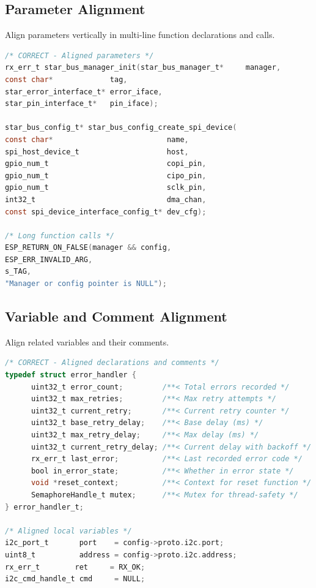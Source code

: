 \subsection{Parameter Alignment}

Align parameters vertically in multi-line function declarations and calls.

\begin{lstlisting}[language=C]
/* CORRECT - Aligned parameters */
rx_err_t star_bus_manager_init(star_bus_manager_t*     manager,
const char*             tag,
star_error_interface_t* error_iface,
star_pin_interface_t*   pin_iface);

star_bus_config_t* star_bus_config_create_spi_device(
const char*                          name,
spi_host_device_t                    host,
gpio_num_t                           copi_pin,
gpio_num_t                           cipo_pin,
gpio_num_t                           sclk_pin,
int32_t                              dma_chan,
const spi_device_interface_config_t* dev_cfg);

/* Long function calls */
ESP_RETURN_ON_FALSE(manager && config,
ESP_ERR_INVALID_ARG,
s_TAG,
"Manager or config pointer is NULL");
\end{lstlisting}

\subsection{Variable and Comment Alignment}

Align related variables and their comments.

\begin{lstlisting}[language=C]
/* CORRECT - Aligned declarations and comments */
typedef struct error_handler {
      uint32_t error_count;         /**< Total errors recorded */
      uint32_t max_retries;         /**< Max retry attempts */
      uint32_t current_retry;       /**< Current retry counter */
      uint32_t base_retry_delay;    /**< Base delay (ms) */
      uint32_t max_retry_delay;     /**< Max delay (ms) */
      uint32_t current_retry_delay; /**< Current delay with backoff */
      rx_err_t last_error;          /**< Last recorded error code */
      bool in_error_state;          /**< Whether in error state */
      void *reset_context;          /**< Context for reset function */
      SemaphoreHandle_t mutex;      /**< Mutex for thread-safety */
} error_handler_t;

/* Aligned local variables */
i2c_port_t       port    = config->proto.i2c.port;
uint8_t          address = config->proto.i2c.address;
rx_err_t        ret     = RX_OK;
i2c_cmd_handle_t cmd     = NULL;
\end{lstlisting}

